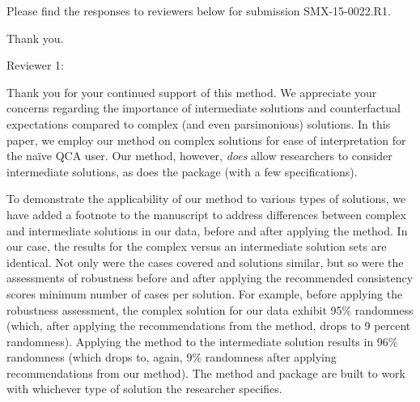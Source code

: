 \documentclass[12pt,stdletter,dateno,sigleft]{newlfm} %
\begin{document}
\begin{newlfm}


Please find the responses to reviewers below for submission SMX-15-0022.R1. %

Thank you. \newline

Reviewer 1: 

Thank you for your continued support of this method. We appreciate your concerns regarding the importance of intermediate solutions and counterfactual expectations compared to complex (and even parsimonious) solutions. In this paper, we employ our method on complex solutions for ease of interpretation for the na{\"i}ve QCA user. Our method, however, \textit{does} allow researchers to consider intermediate solutions, as does the package (with a few specifications). 

To demonstrate the applicability of our method to various types of solutions, we have added a footnote to the manuscript to address differences between complex and intermediate solutions in our data, before and after applying the method. In our case, the results for the complex versus an intermediate solution sets are identical. Not only were the cases covered and solutions similar, but so were the assessments of robustness before and after applying the recommended consistency scores minimum number of cases per solution. For example, before applying the robustness assessment, the complex solution for our data exhibit 95\% randomness (which, after applying the recommendations from the method, drops to 9 percent randomness). Applying the method to the intermediate solution results in 96\% randomness (which drops to, again, 9\% randomness after applying recommendations from our method). The method and package are built to work with whichever type of solution the researcher specifies. \newline


\end{newlfm}
\end{document}
